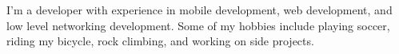 \begin{lettertextstyle}
I'm a developer with experience in mobile development, web development, and low level networking development. Some of my hobbies include playing soccer, riding my bicycle, rock climbing, and working on side projects.
\end{lettertextstyle}